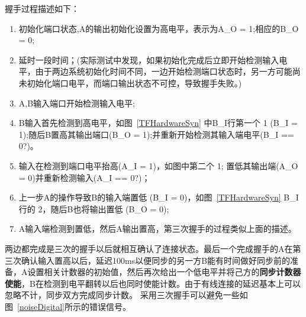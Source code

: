 握手过程描述如下：
\begin{enumerate}
\item 初始化端口状态,A的输出初始化设置为高电平，表示为A\_{}O = 1;相应的B\_{}O = 0;
\item 延时一段时间；(实际测试中发现，如果初始化完成后立即开始检测输入电平，由于两边系统初始化时间不同，一边开始检测端口状态时，另一方可能尚未初始化端口电平，而端口输出状态不可控，导致握手失败。)
\item	A,B输入端口开始检测输入电平;
\item B输入首先检测到高电平，如图~\ref{TFHardwareSyn} 中B\_{}I行第一个 {\textcircled{\small{1}}} (B\_I = 1);随后B置高其输出端口(B\_O = 1);并重新开始检测其输入端电平(B\_I == 0?)。
\item 输入在检测到端口电平抬高(A\_{}I = 1)，如图中第二个 {\textcircled{\small{1}}}; 置低其输出端(A\_{}O = 0)并重新检测输入(A\_{}I == 0?)；
\item 上一步A的操作导致B的输入端置低 (B\_{}I = 0)，如图~\ref{TFHardwareSyn} B\_{}I 行的 {\textcircled{\small{2}}}，随后B也将输出置低 (B\_{}O = 0);
\item A输入端检测到置低，然后A输出置高，第三次握手的过程类似上面的描述。
\end{enumerate}

	两边都完成是三次的握手以后就相互确认了连接状态。最后一个完成握手的A在第三次确认输入置高以后，延迟100ms以便同步的另一方B能有时间做好同步前的准备，A设置相关计数器的初始值，然后再次给出一个低电平并将己方的\textbf{同步计数器使能}，B在检测到电平翻转以后也同时使能计数。由于有线连接的延迟基本上可以忽略不计，同步双方完成同步计数。
%
%
%
	采用三次握手可以避免一些如图~\ref{noiseDigital}所示的错误信号。

